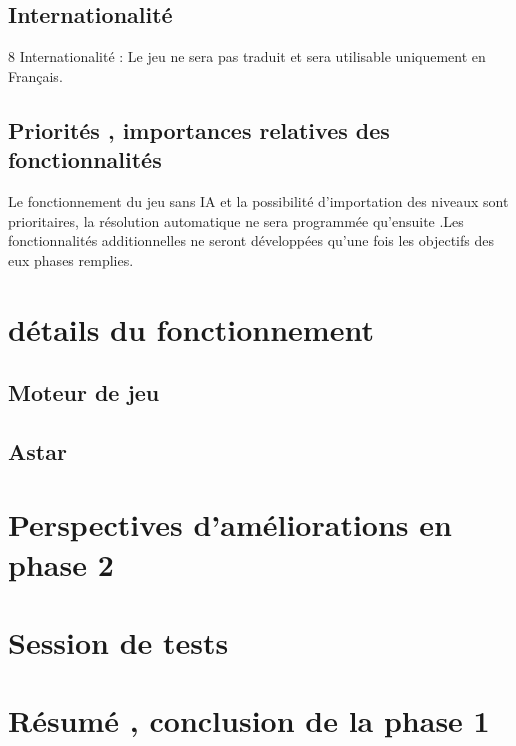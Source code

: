 \documentclass{article}
\begin{document}
		\subsection{Internationalité}
		8 Internationalité :
Le jeu ne sera pas traduit et sera utilisable uniquement en Français.
		\subsection{Priorités , importances relatives des fonctionnalités}
		Le fonctionnement du jeu sans IA et la possibilité d’importation des niveaux
sont prioritaires, la résolution automatique ne sera programmée qu’ensuite .Les
fonctionnalités additionnelles ne seront développées qu’une fois les objectifs des
eux phases remplies.
\newpage
	\section{détails du fonctionnement}
		\subsection{Moteur de jeu}
		\subsection{Astar}
		\newpage
	\section{Perspectives d'améliorations en phase 2}
	\newpage
	\section{Session de tests}
	\newpage
	\section{Résumé , conclusion de la phase 1}
	


		

\newpage
\end{document}
